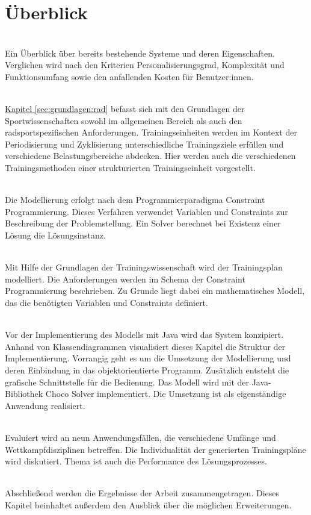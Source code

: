 \section{Überblick}
\label{sec:intro:ueberblick}
\textbf{} \\[0.2em]
Ein Überblick über bereits bestehende Systeme und deren Eigenschaften. Verglichen wird nach den Kriterien Personalisierungsgrad, Komplexität und Funktionsumfang sowie den anfallenden Kosten für Benutzer:innen.

\textbf{} \\[0.2em]
\hyperref[sec:grundlagen:rad]{Kapitel \ref{sec:grundlagen:rad}} befasst sich mit den Grundlagen der Sportwissenschaften sowohl im allgemeinen Bereich als auch den radsportspezifischen Anforderungen. Trainingseinheiten werden im Kontext der Periodisierung und Zyklisierung unterschiedliche Trainingsziele erfüllen und verschiedene Belastungsbereiche abdecken. Hier werden auch die verschiedenen Trainingsmethoden einer strukturierten Trainingseinheit vorgestellt.

\textbf{} \\[0.2em]
Die Modellierung erfolgt nach dem Programmierparadigma Constraint Programmierung. Dieses Verfahren verwendet Variablen und Constraints zur Beschreibung der Problemstellung. Ein Solver berechnet bei Existenz einer Lösung die Lösungsinstanz. 

\textbf{} \\[0.2em]
Mit Hilfe der Grundlagen der Trainingswissenschaft wird der Trainingsplan modelliert. Die Anforderungen werden im Schema der Constraint Programmierung beschrieben. Zu Grunde liegt dabei ein mathematisches Modell, das die benötigten Variablen und Constraints definiert.

\textbf{} \\[0.2em]
Vor der Implementierung des Modells mit Java wird das System konzipiert. Anhand von Klassendiagrammen visualisiert dieses Kapitel die Struktur der Implementierung. Vorrangig geht es um die Umsetzung der Modellierung und deren Einbindung in das objektorientierte Programm. Zusätzlich entsteht die grafische Schnittstelle für die Bedienung. Das Modell wird mit der Java-Bibliothek Choco Solver implementiert. Die Umsetzung ist als eigenständige Anwendung realisiert. 

\textbf{} \\[0.2em]
Evaluiert wird an neun Anwendungsfällen, die verschiedene Umfänge und Wettkampfdisziplinen betreffen. Die Individualität der generierten Trainingspläne wird diskutiert. Thema ist auch die Performance des Lösungsprozesses.

\textbf{} \\[0.2em]
Abschließend werden die Ergebnisse der Arbeit zusammengetragen. Dieses Kapitel beinhaltet außerdem den Ausblick über die möglichen Erweiterungen.